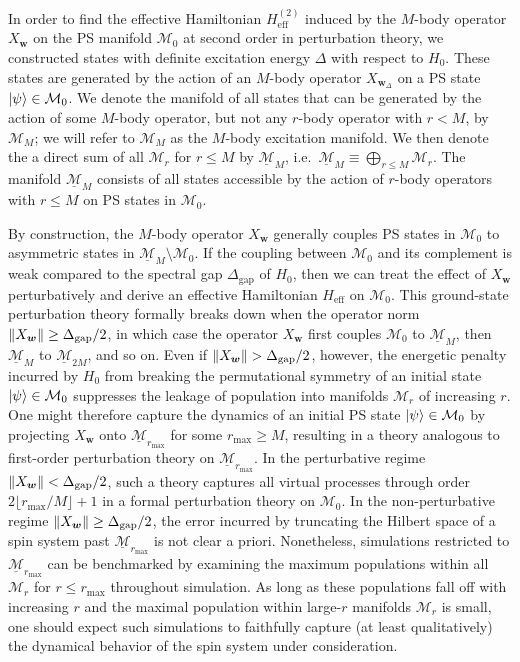 \documentclass[nofootinbib,notitlepage,11pt]{revtex4-2}
\renewcommand{\t}{\text} %
\newcommand{\m}{\bm} %
\newcommand{\1}{\mathds{1}}
\newcommand{\M}{\mathcal{M}}
\newcommand{\ul}{\underline}
\newcommand{\floor}[1]{\lfloor{#1}\rfloor}
\begin{document}
In order to find the effective Hamiltonian $H_{\t{eff}}^{(2)}$ induced
by the $M$-body operator $X_{\m w}$ on the PS manifold $\M_0$ at
second order in perturbation theory, we constructed states with
definite excitation energy $\Delta$ with respect to $H_0$.  These
states are generated by the action of an $M$-body operator
$X_{\m w_\Delta}$ on a PS state $\ket\psi\in\M_0$.  We denote the
manifold of all states that can be generated by the action of some
$M$-body operator, but not any $r$-body operator with $r<M$, by
$\M_M$; we will refer to $\M_M$ as the $M$-body excitation manifold.
We then denote the a direct sum of all $\M_r$ for $r\le M$ by
$\ul{\M}_M$, i.e.~$\ul{\M}_M\equiv\bigoplus_{r\le M}\M_r$.  The
manifold $\ul{\M}_M$ consists of all states accessible by the action
of $r$-body operators with $r\le M$ on PS states in $\M_0$.

By construction, the $M$-body operator $X_{\m w}$ generally couples PS
states in $\M_0$ to asymmetric states in $\ul{\M}_M\setminus\M_0$.  If
the coupling between $\M_0$ and its complement is weak compared to the
spectral gap $\Delta_{\t{gap}}$ of $H_0$, then we can treat the effect
of $X_{\m w}$ perturbatively and derive an effective Hamiltonian
$H_{\t{eff}}$ on $\M_0$.  This ground-state perturbation theory
formally breaks down when the operator norm
$\norm{X_{\m w}}\ge\Delta_{\t{gap}}/2$, in which case the operator
$X_{\m w}$ first couples $\M_0$ to $\ul{\M}_M$, then $\ul{\M}_M$ to
$\ul{\M}_{2M}$, and so on.  Even if
$\norm{X_{\m w}}>\Delta_{\t{gap}}/2$, however, the energetic penalty
incurred by $H_0$ from breaking the permutational symmetry of an
initial state $\ket\psi\in\M_0$ suppresses the leakage of population
into manifolds $\M_r$ of increasing $r$.  One might therefore capture
the dynamics of an initial PS state $\ket\psi\in\M_0$ by projecting
$X_{\m w}$ onto $\ul{\M}_{r_{\t{max}}}$ for some $r_{\t{max}}\ge M$,
resulting in a theory analogous to first-order perturbation theory on
$\ul{\M}_{r_{\t{max}}}$.  In the perturbative regime
$\norm{X_{\m w}}<\Delta_{\t{gap}}/2$, such a theory captures all
virtual processes through order $2\floor{r_{\t{max}}/M}+1$ in a formal
perturbation theory on $\M_0$.  In the non-perturbative regime
$\norm{X_{\m w}}\ge\Delta_{\t{gap}}/2$, the error incurred by
truncating the Hilbert space of a spin system past
$\ul{\M}_{r_{\t{max}}}$ is not clear a priori.  Nonetheless,
simulations restricted to $\ul{\M}_{r_{\t{max}}}$ can be benchmarked
by examining the maximum populations within all $\M_r$ for
$r\le r_{\t{max}}$ throughout simulation.  As long as these
populations fall off with increasing $r$ and the maximal population
within large-$r$ manifolds $\M_r$ is small, one should expect such
simulations to faithfully capture (at least qualitatively) the
dynamical behavior of the spin system under consideration.
\end{document}
